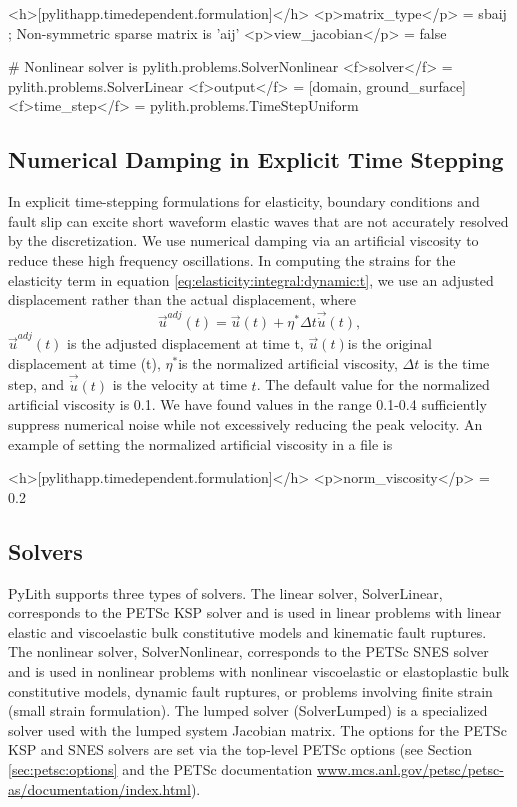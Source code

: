 \begin{cfg}
<h>[pylithapp.timedependent.formulation]</h>
<p>matrix_type</p> = sbaij ; Non-symmetric sparse matrix is 'aij'
<p>view_jacobian</p> = false

# Nonlinear solver is pylith.problems.SolverNonlinear
<f>solver</f> = pylith.problems.SolverLinear
<f>output</f> = [domain, ground_surface]
<f>time_step</f> = pylith.problems.TimeStepUniform
\end{cfg}

\subsection{Numerical Damping in Explicit Time Stepping}

In explicit time-stepping formulations for elasticity, boundary conditions
and fault slip can excite short waveform elastic waves that are not
accurately resolved by the discretization. We use numerical damping
via an artificial viscosity\cite{Knopoff:Ni:2001,Day:Ely:2002} to
reduce these high frequency oscillations. In computing the strains
for the elasticity term in equation \vref{eq:elasticity:integral:dynamic:t},
we use an adjusted displacement rather than the actual displacement,
where 
\begin{equation}
\vec{u}^{adj}(t)=\vec{u}(t)+\eta^{*}\Delta t\vec{\dot{u}}(t),
\end{equation}
$\vec{u}^{adj}(t)$ is the adjusted displacement at time t, $\vec{u}(t)$is
the original displacement at time (t), $\eta^{*}$is the normalized
artificial viscosity, $\Delta t$ is the time step, and $\vec{\dot{u}}(t)$
is the velocity at time $t$. The default value for the normalized
artificial viscosity is 0.1. We have found values in the range 0.1-0.4
sufficiently suppress numerical noise while not excessively reducing
the peak velocity. An example of setting the normalized artificial
viscosity in a  file is
\begin{cfg}
<h>[pylithapp.timedependent.formulation]</h>
<p>norm_viscosity</p> = 0.2
\end{cfg}

\subsection{Solvers}
\label{sec:solvers}

PyLith supports three types of solvers. The linear solver,
SolverLinear, corresponds to the PETSc KSP solver and is used in
linear problems with linear elastic and viscoelastic bulk constitutive
models and kinematic fault ruptures. The nonlinear solver,
SolverNonlinear, corresponds to the PETSc SNES solver and is used in
nonlinear problems with nonlinear viscoelastic or elastoplastic bulk
constitutive models, dynamic fault ruptures, or problems involving
finite strain (small strain formulation).  The lumped solver
(SolverLumped) is a specialized solver used with the lumped system
Jacobian matrix. The options for the PETSc KSP and SNES solvers are
set via the top-level PETSc options (see Section
\vref{sec:petsc:options} and the PETSc documentation
\url{www.mcs.anl.gov/petsc/petsc-as/documentation/index.html}).


